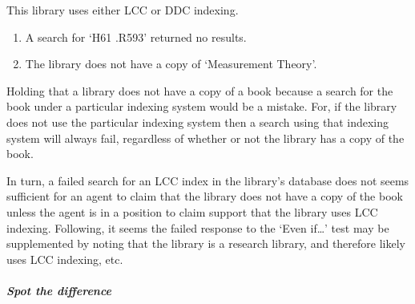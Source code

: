 \begin{note}
  This library uses either LCC or DDC indexing.
  \begin{enumerate}
  \item A search for `H61 .R593' returned no results.
  \item The library does not have a copy of `Measurement Theory'.
  \end{enumerate}

  Holding that a library does not have a copy of a book because a search for the book under a particular indexing system would be a mistake.
  For, if the library does not use the particular indexing system then a search using that indexing system will always fail, regardless of whether or not the library has a copy of the book.

  In turn, a failed search for an LCC index in the library's database does not seems sufficient for an agent to claim that the library does not have a copy of the book unless the agent is in a position to claim support that the library uses LCC indexing.
  Following, it seems the failed response to the `Even if\dots' test may be supplemented by noting that the library is a research library, and therefore likely uses LCC indexing, etc.\
\end{note}

\subparagraph{Spot the difference}

